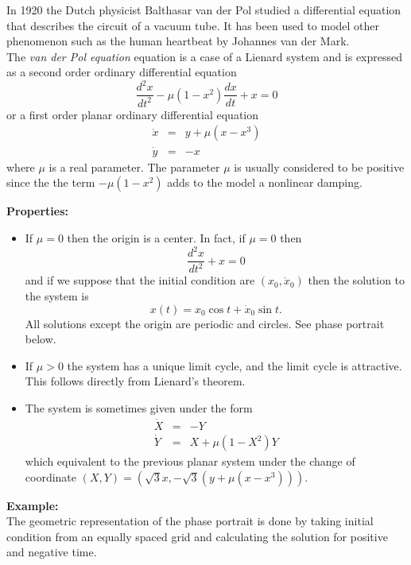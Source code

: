 \documentclass[12pt]{article}
\begin{document}

In 1920 the Dutch physicist Balthasar van der Pol studied a differential equation that describes the circuit of a vacuum tube. 
It has been used
to model other phenomenon such as the human heartbeat by
Johannes van der Mark\cite{C}.\\

The \emph{van der Pol equation} 
equation is a case of a Lienard system and is expressed as
a second order ordinary differential equation
$$\frac{d^2x}{dt^2}-\mu(1-x^2)\frac{dx}{dt}+x=0$$
or a first order planar ordinary differential equation
\begin{eqnarray*}
\dot{x} & = & y + \mu(x-x^3)\\
\dot{y} & = & -x
\end{eqnarray*}
where $\mu$ is a real parameter.  
The parameter $\mu$ is usually considered to be positive since
the the term $-\mu(1-x^2)$ adds to the model a nonlinear damping. \cite{C}

\textbf{Properties:}
\begin{itemize}
\item If $\mu=0$ then the origin is a center. In fact, if $\mu=0$ then
$$\frac{d^2x}{dt^2}+x=0$$ 
and if we suppose that the initial condition are
$(x_0,\dot{x}_0)$ then the solution to the system is 
$$x(t)=x_0\cos t + \dot{x}_0\sin t.$$ All
solutions except the origin are periodic and circles.  See phase portrait below. 
\item If $\mu>0$ the system has a unique limit cycle, and the limit
cycle is attractive.  This follows directly from Lienard's theorem. \cite{P}
\item The system is sometimes given under the form
\begin{eqnarray*}
\dot{X} &=& -Y\\
\dot{Y} &=& X + \mu(1-X^2)Y
\end{eqnarray*}
which equivalent to the previous planar system 
under the change of coordinate $(X, Y)= (\sqrt{3}x,-\sqrt{3}(y+\mu(x-x^3)))$.\cite{C}
\end{itemize}

\textbf{Example:}\\
The geometric representation of the phase portrait is done 
by taking initial condition from
an equally spaced grid and calculating the solution for positive and
negative time.  
\end{document}
